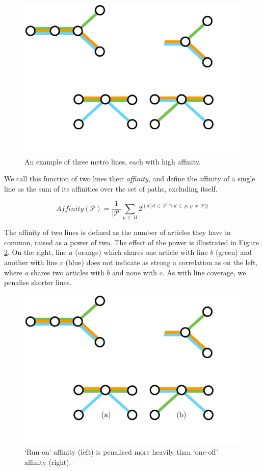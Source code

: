 \begin{figure}[htbp!]
	\centering
	\includegraphics[width=.5\textwidth]{img/implementation/lowaffinity.pdf}
	\caption{An example of three metro lines, each with high affinity.}
	\label{fig:lowaffinity}
\end{figure}

We call this function of two lines their \textit{affinity}, and define the affinity of a single line as the sum of its affinities over the set of paths, excluding itself.

\begin{equation}
	Affinity(\mathcal{P}) = \frac{1}{|\mathcal{P}|} \sum_{p\,\in{\,\Pi}} 2^{|\{\,d\,|\,d\,\in\,{\mathcal{P}}\,\cap\,d\,\in\,{p},\,p\,\neq\,\mathcal{P}\}|}
\end{equation}

The affinity of two lines is defined as the number of articles they have in common, raised as a power of two. The effect of the power is illustrated in Figure \ref{fig:abcaffinity}. On the right, line $a$ (orange) which shares one article with line $b$ (green) and another with line $c$ (blue) does not indicate as strong a correlation as on the left, where $a$ shares two articles with $b$ and none with $c$. As with line coverage, we penalise shorter lines.

\begin{figure}[htbp!]
	\centering
	\includegraphics[width=\textwidth]{img/implementation/abcaffinity.pdf}
	\caption{`Run-on' affinity (left) is penalised more heavily than `one-off' affinity (right).}
	\label{fig:abcaffinity}
\end{figure}

